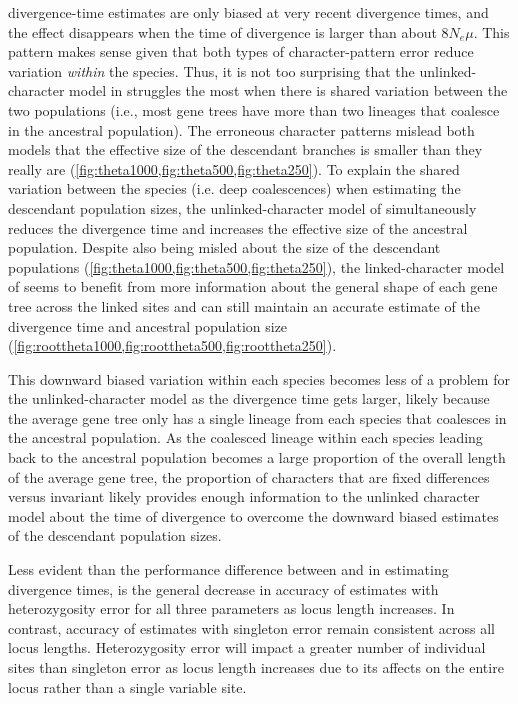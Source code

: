 \ecoevolity divergence-time estimates are only biased at
very recent divergence times, and the effect disappears
when the time of divergence is larger than about $8N_e\mu$.
This pattern makes sense given that both types of character-pattern error
reduce variation \emph{within} the species.
Thus, it is not too surprising that the unlinked-character model in \ecoevolity
struggles the most when there is shared variation between
the two populations (i.e., most gene trees have more than
two lineages that coalesce in the ancestral population).
The erroneous character patterns mislead both models that the effective size of
the descendant branches is smaller than they really are
(\cref{fig:theta1000,fig:theta500,fig:theta250}).
To explain the shared variation between the species (i.e. deep coalescences)
when estimating the descendant population sizes,
the unlinked-character model of \ecoevolity
simultaneously reduces the divergence time and increases the effective
size of the ancestral population.
Despite also being misled about the size of the descendant populations
(\cref{fig:theta1000,fig:theta500,fig:theta250}),
the linked-character model of \beast seems to benefit from more information
about the general shape of each gene tree across the linked sites and can still
maintain an accurate estimate of the divergence time
\timefigsp
and ancestral population size
(\cref{fig:roottheta1000,fig:roottheta500,fig:roottheta250}).

This downward biased variation within each species becomes
less of a problem for the unlinked-character model as the
divergence time gets larger, likely because the average gene
tree only has a single lineage from each species that coalesces
in the ancestral population.
As the coalesced lineage within each species leading back
to the ancestral population becomes a large proportion
of the overall length of the average gene tree,
the proportion of characters that are fixed differences versus invariant
likely provides enough information to
the unlinked character model about the time of divergence to overcome
the downward biased estimates of the descendant population sizes.

Less evident than the performance difference between \ecoevolity and \beast 
in estimating divergence times, is the general decrease in accuracy of \ecoevolity 
estimates with heterozygosity error for all three parameters as locus length 
increases. In contrast, accuracy of estimates with singleton error remain consistent across 
all locus lengths. Heterozygosity error will impact a greater number of individual
sites than singleton error as locus length increases due to its affects on the entire 
locus rather than a single variable site.    

